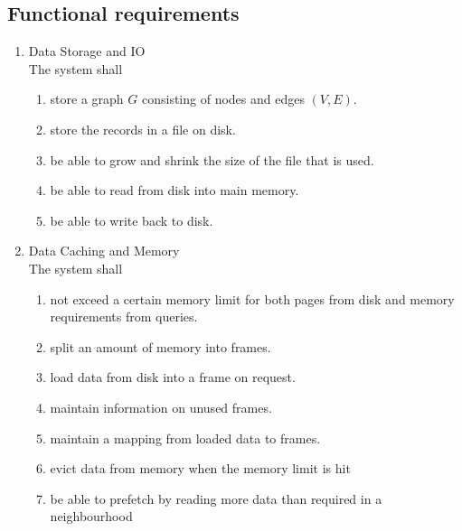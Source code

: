 	\subsection{Functional requirements}
\begin{enumerate}[label*=\arabic*]
\item Data Storage and IO \\
    The system shall
	\begin{enumerate}[label*=\arabic*]
	\item store a graph $G$ consisting of nodes and edges $(V, E)$.
	\item store the records in a file on disk.
    \item be able to grow and shrink the size of the file that is used.
    \item be able to read from disk into main memory.
    \item be able to write back to disk.
	\end{enumerate}
	
\item Data Caching and Memory  \\
    The system shall
	\begin{enumerate}[label*=\arabic*]
	\item not exceed a certain memory limit for both pages from disk and memory requirements from queries.
	\item split an amount of memory into frames.
	\item load data from disk into a frame on request.
	\item maintain information on unused frames.
	\item maintain a mapping from loaded data to frames.
	\item evict data from memory when the memory limit is hit
	\item be able to prefetch by reading more data than required in a neighbourhood
	\end{enumerate}


\end{enumerate}

